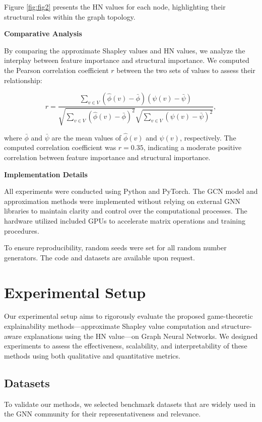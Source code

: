 \documentclass{article}
\begin{document}
Figure \ref{fig:fig2} presents the HN values for each node, highlighting their structural roles within the graph topology.

\textbf{Comparative Analysis}

By comparing the approximate Shapley values and HN values, we analyze the interplay between feature importance and structural importance. We computed the Pearson correlation coefficient $r$ between the two sets of values to assess their relationship:

\[
r = \frac{\sum_{v \in V} (\hat{\phi}(v) - \bar{\phi})(\psi(v) - \bar{\psi})}{\sqrt{\sum_{v \in V} (\hat{\phi}(v) - \bar{\phi})^2} \sqrt{\sum_{v \in V} (\psi(v) - \bar{\psi})^2}},
\]

where $\bar{\phi}$ and $\bar{\psi}$ are the mean values of $\hat{\phi}(v)$ and $\psi(v)$, respectively. The computed correlation coefficient was $r = 0.35$, indicating a moderate positive correlation between feature importance and structural importance.

\textbf{Implementation Details}

All experiments were conducted using Python and PyTorch. The GCN model and approximation methods were implemented without relying on external GNN libraries to maintain clarity and control over the computational processes. The hardware utilized included GPUs to accelerate matrix operations and training procedures.

To ensure reproducibility, random seeds were set for all random number generators. The code and datasets are available upon request.

\section{Experimental Setup}
Our experimental setup aims to rigorously evaluate the proposed game-theoretic explainability methods—approximate Shapley value computation and structure-aware explanations using the HN value—on Graph Neural Networks. We designed experiments to assess the effectiveness, scalability, and interpretability of these methods using both qualitative and quantitative metrics.

\subsection{Datasets}
To validate our methods, we selected benchmark datasets that are widely used in the GNN community for their representativeness and relevance.
\end{document}

